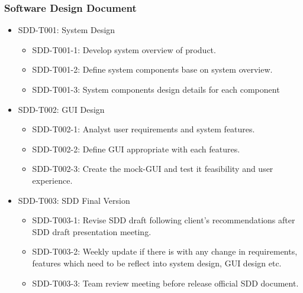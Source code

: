 	\subsubsection{Software Design Document}
	\begin{itemize}
			\item SDD-T001: System Design
			\begin{itemize}
				\item SDD-T001-1: Develop system overview of product.
				\item SDD-T001-2: Define system components base on system overview.
				\item SDD-T001-3: System components design details for each component
			\end{itemize}
			\item SDD-T002: GUI Design
			\begin{itemize}
				\item SDD-T002-1: Analyst user requirements and system features.
				\item SDD-T002-2: Define GUI appropriate with each features.
				\item SDD-T002-3: Create the mock-GUI and test it feasibility and user experience.
			\end{itemize}
			\item SDD-T003: SDD Final Version
			\begin{itemize}
				\item  SDD-T003-1: Revise SDD draft following client's recommendations after SDD draft presentation meeting.
				\item  SDD-T003-2: Weekly update if there is with any change in requirements, features which need to be reflect into system design, GUI design etc.
				\item  SDD-T003-3: Team review meeting before release official SDD document.
			\end{itemize}
	\end{itemize}

